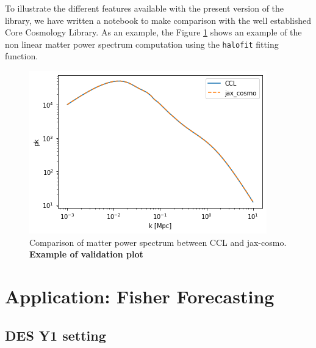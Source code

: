 \documentclass[twocolumn,twocolappendix,nofootinbib]{openjournal}
\newcommand{\nblink}[1]{\href{https://github.com/DifferentiableUniverseInitiative/jax-cosmo-paper/blob/master/notebooks/#1.ipynb}{\faFileCodeO}}
\begin{document}
%
To illustrate the different features available with the present version of the library, we have written a  notebook to make  comparison with the well established  Core Cosmology Library. As an example, the Figure \ref{fig:halofit_comparison} shows an example of the non linear matter power spectrum computation using the \texttt{halofit} fitting function. 
%
\begin{figure}[ht]
    \centering
    \includegraphics[width=\columnwidth]{figures/halofit_pk.png}
    \caption{Comparison of matter power spectrum between CCL and jax-cosmo. \textbf{Example of validation plot} \nblink{CCL_comparison}}
    \label{fig:halofit_comparison}
\end{figure}



\section{Application: Fisher Forecasting}
\label{sec-fisher-forecast}




\subsection{DES Y1 setting}
 
\end{document}
